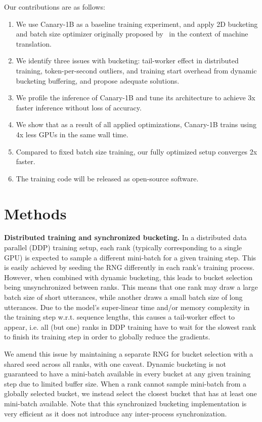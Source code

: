 \documentclass[11pt]{article}
\begin{document}
Our contributions are as follows:
\begin{enumerate}
    \item We use Canary-1B as a baseline training experiment, and apply 2D bucketing and batch size optimizer originally proposed by~\citet{zelasko2024emmett} in the context of machine translation.
    \item We identify three issues with bucketing: tail-worker effect in distributed training, token-per-second outliers, and training start overhead from dynamic bucketing buffering, and propose adequate solutions.
    \item We profile the inference of Canary-1B and tune its architecture to achieve 3x faster inference without loss of accuracy.
    \item We show that as a result of all applied optimizations, Canary-1B trains using 4x less GPUs in the same wall time.
    \item Compared to fixed batch size training, our fully optimized setup converges 2x faster.
    \item The training code will be released as  open-source software.
\end{enumerate}

\section{Methods}
\label{sec:methods}

\textbf{Distributed training and synchronized bucketing.} In a distributed data parallel (DDP) training setup, each rank (typically corresponding to a single GPU) is expected to sample a different mini-batch for a given training step. This is easily achieved by seeding the RNG differently in each rank's training process. However, when combined with dynamic bucketing, this leads to bucket selection being unsynchronized between ranks. This means that one rank may draw a large batch size of short utterances, while another draws a small batch size of long utterances. Due to the model's super-linear time and/or memory complexity in the training step w.r.t. sequence lengths, this causes a tail-worker effect to appear, i.e. all (but one) ranks in DDP training have to wait for the slowest rank to finish its training step in order to globally reduce the gradients. 

We amend this issue by maintaining a separate RNG for bucket selection with a shared seed across all ranks, with one caveat. Dynamic bucketing is not guaranteed to have a mini-batch available in every bucket at any given training step due to limited buffer size. When a rank cannot sample mini-batch from a globally selected bucket, we instead select the closest bucket that has at least one mini-batch available. Note that this synchronized bucketing implementation is very efficient as it does not introduce any inter-process synchronization.
\end{document}

